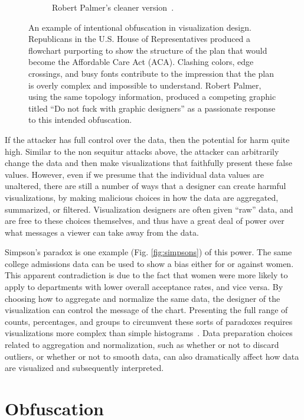 \documentclass{vgtc}                          %
\begin{document}
\begin{figure}
\begin{subfigure}{0.9\columnwidth}
		\caption{Robert Palmer's cleaner version~\protect\cite{dontfuck}.}
	\end{subfigure}
	\caption{An example of intentional obfuscation in visualization design. Republicans in the U.S. House of Representatives produced a flowchart purporting to show the structure of the plan that would become the Affordable Care Act (ACA). Clashing colors, edge crossings, and busy fonts contribute to the impression that the plan is overly complex and impossible to understand. Robert Palmer, using the same topology information, produced a competing graphic titled ``Do not fuck with graphic designers'' as a passionate response to this intended obfuscation.}
	\label{fig:obfuscation}
\end{figure}

If the attacker has full control over the data, then the potential for harm quite high. Similar to the non sequitur attacks above, the attacker can arbitrarily change the data and then make visualizations that faithfully present these false values. However, even if we presume that the individual data values are unaltered, there are still a number of ways that a designer can create harmful visualizations, by making malicious choices in how the data are aggregated, summarized, or filtered. Visualization designers are often given ``raw'' data, and are free to these choices themselves, and thus have a great deal of power over what messages a viewer can take away from the data.

Simpson's paradox is one example (Fig. \ref{fig:simpsons}) of this power. The same college admissions data can be used to show a bias either for or against women. This apparent contradiction is due to the fact that women were more likely to apply to departments with lower overall acceptance rates, and vice versa. By choosing how to aggregate and normalize the same data, the designer of the visualization can control the message of the chart. Presenting the full range of counts, percentages, and groups to circumvent these sorts of paradoxes requires visualizations more complex than simple histograms~\cite{poco2018extracting}. Data preparation choices related to aggregation and normalization, such as whether or not to discard outliers, or whether or not to smooth data, can also dramatically affect how data are visualized and subsequently interpreted.

\section{Obfuscation}
\end{document}
